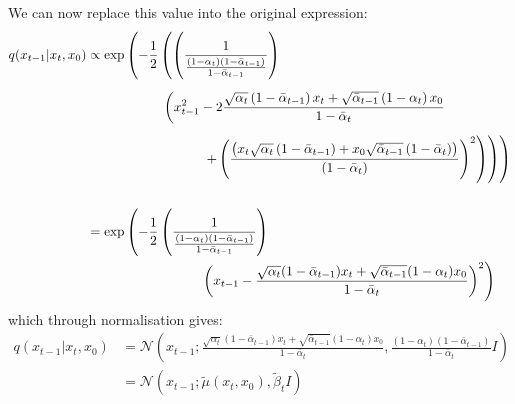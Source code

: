 \documentclass{article}
\numberwithin{equation}{section}
\numberwithin{figure}{section}
\begin{document}
We can now replace this value into the original expression:
\begin{align}
  q(x_{t-1} | x_t, x_0) &\propto \exp \left(- \frac{1}{2} \left( \left(\frac{1}{\frac{\left(1 - \alpha_t\right)\left(1 - \bar{\alpha}_{t-1}\right)}{1 - \bar{\alpha}_{t-1}}}\right) \right. \right. \\[5pt]
  & \hspace{2cm} \left(x_{t-1}^2 -2 \frac{\sqrt{\alpha_t} \left(1 - \bar{\alpha}_{t-1}\right) x_t + \sqrt{\bar{\alpha}_{t-1}}\left(1 - \alpha_t\right) x_0}{1 - \bar{\alpha}_t} \right. \notag \\[5pt]
  & \hspace{3cm} \left. \left. \left. + \left(\frac{\left( x_t \sqrt{\alpha_t} \left( 1 - \bar{\alpha}_{t-1} \right) + x_0 \sqrt{\bar{\alpha}_{t-1}} \left( 1 - \bar{\alpha}_t \right) \right)}{\left(1 - \bar{\alpha}_{t}\right)} \right)^2 \right) \right) \right) \\[15pt]
  &= \exp \left(- \frac{1}{2} \left(\frac{1}{\frac{\left(1 - \alpha_t\right)\left(1 - \bar{\alpha}_{t-1}\right)}{1 - \bar{\alpha}_{t-1}}}\right) \right. \\
  & \hspace{3cm} \left. \left( x_{t-1} - \frac{\sqrt{\alpha_t}(1 - \bar{\alpha}_{t-1}) x_t + \sqrt{\bar{\alpha}_{t-1}}(1 - \alpha_t) x_0}{1 - \bar{\alpha}_t} \right)^2  \right) \notag
\end{align}
which through normalisation gives:
\begin{align}
  q(x_{t-1} | x_t, x_0) &= \mathcal{N} \left(x_{t-1}; \frac{\sqrt{\alpha_t}(1 - \bar{\alpha}_{t-1}) x_t + \sqrt{\bar{\alpha}_{t-1}}(1 - \alpha_t) x_0}{1 - \bar{\alpha}_t} , \frac{\left(1 - \alpha_t\right)\left(1 - \bar{\alpha}_{t-1}\right)}{1 - \bar{\alpha}_{t}} I \right) \\[15pt]
  &= \mathcal{N} \left(x_{t-1}; \tilde{\mu}(x_t, x_0), \tilde{\beta}_t I \right)
\end{align}
\end{document}
